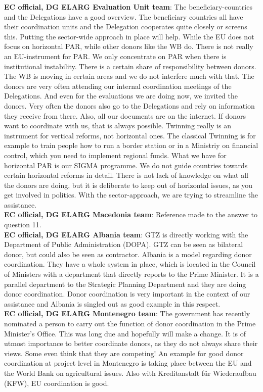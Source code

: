 \textbf{EC official, DG ELARG Evaluation Unit team}: The beneficiary-countries and the Delegations have a good overview. The beneficiary countries all have their coordination units and the Delegation cooperates quite closely or screens this. Putting the sector-wide approach in place will help. While the EU does not focus on horizontal PAR, while other donors like the WB do. There is not really an EU-instrument for PAR. We only concentrate on PAR when there is institutional instability. There is a certain share of responsibility between donors. The WB is moving in certain areas and we do not interfere much with that. The donors are very often attending our internal coordination meetings of the Delegations. And even for the evaluations we are doing now, we invited the donors. Very often the donors also go to the Delegations and rely on information they receive from there. Also, all our documents are on the internet. If donors want to coordinate with us, that is always possible. Twinning really is an instrument for vertical reforms, not horizontal ones. The classical Twinning is for example to train people how to run a border station or in a Ministriy on financial control, which you need to implement regional funds. What we have for horizontal PAR is our SIGMA programme. We do not guide countries towards certain horizontal reforms in detail. There is not lack of knowledge on what all the donors are doing, but it is deliberate to keep out of horizontal issues, as you get involved in politics. With the sector-approach, we are trying to streamline the assistance.\\ 
\textbf{EC official, DG ELARG Macedonia team}: Reference made to the answer to question 11.\\
\textbf{EC official, DG ELARG Albania team}: GTZ is directly working with the Department of Public Administration (DOPA). GTZ can be seen as bilateral donor, but could also be seen as contractor. Albania is a model regarding donor coordination. They have a whole system in place, which is located in the Council of Ministers with a department that directly reports to the Prime Minister. It is a parallel department to the Strategic Planning Department and they are doing donor coordination. Donor coordination is very important in the context of our assistance and Albania is singled out as good example in this respect.\\
\textbf{EC official, DG ELARG Montenegro team}: The government has recently nominated a person to carry out the function of donor coordination in the Prime Minister's Office. This was long due and hopefully will make a change. It is of utmost importance to better coordinate donors, as they do not always share their views. Some even think that they are competing! An example for good donor coordination at project level in Montenegro is taking place between the EU and the World Bank on agricultural issues. Also with Kreditanstalt für Wiederaufbau (KFW), EU coordination is good.\\
